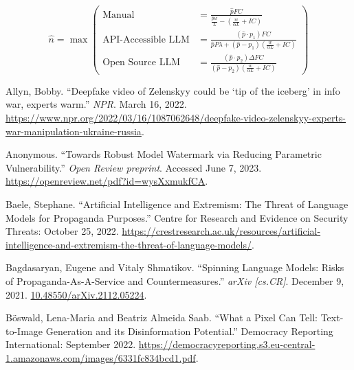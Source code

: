 \documentclass{article}
\begin{document}
\begin{equation}
  \hat{n} = \max \left(
    \begin{aligned}
      \text{Manual} &= \frac{\hat{p} FC}{\frac{\hat{p} w}{L} - \left( \frac{w}{\alpha L} + IC \right)} \\
      \text{API-Accessible LLM} &= \frac{(\hat{p} \cdot p_1) FC}{\hat{p} P \lambda + (\hat{p} - p_1) \left( \frac{w}{\alpha L} + IC \right)} \\
      \text{Open Source LLM} &= \frac{(\hat{p} \cdot p_2) \Delta FC}{(\hat{p} - p_2) \left( \frac{w}{\alpha L} + IC \right)}
    \end{aligned}
  \right)
\end{equation}




\begin{thebibliography}{9}

  Allyn, Bobby. ``Deepfake video of Zelenskyy could be `tip of the iceberg' in info war, experts warm.'' \textit{NPR}. March 16, 2022. \href{https://www.npr.org/2022/03/16/1087062648/deepfake-video-zelenskyy-experts-war-manipulation-ukraine-russia}{https://www.npr.org/2022/03/16/1087062648/deepfake-video-zelenskyy-experts-war-manipulation-ukraine-russia}. 

  Anonymous. ``Towards Robust Model Watermark via Reducing Parametric Vulnerability.'' \textit{Open Review preprint}. Accessed June 7, 2023. \href{https://openreview.net/pdf?id=wysXxmukfCA}{https://openreview.net/pdf?id=wysXxmukfCA}. 

  Baele, Stephane. ``Artificial Intelligence and Extremism: The Threat of Language Models for Propaganda Purposes.'' Centre for Research and Evidence on Security Threats: October 25, 2022. \href{https://crestresearch.ac.uk/resources/artificial-intelligence-and-extremism-the-threat-of-language-models/}{https://crestresearch.ac.uk/resources/artificial-intelligence-and-extremism-the-threat-of-language-models/}.

  Bagdasaryan, Eugene and Vitaly Shmatikov. ``Spinning Language Models: Risks of Propaganda-As-A-Service and Countermeasures.'' \textit{arXiv [cs.CR]}. December 9, 2021. \href{https://arxiv.org/abs/2112.05224}{10.48550/arXiv.2112.05224}.

  Böswald, Lena-Maria and Beatriz Almeida Saab. ``What a Pixel Can Tell: Text-to-Image Generation and its Disinformation Potential.'' Democracy Reporting International: September 2022. \href{https://democracyreporting.s3.eu-central-1.amazonaws.com/images/6331fc834bcd1.pdf}{https://democracyreporting.s3.eu-central-1.amazonaws.com/images/6331fc834bcd1.pdf}. 


\end{thebibliography}
\end{document}
